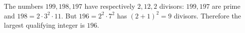 The numbers $199,198,197$ have respectively $2,12,2$ divisors: $199,197$ are prime and $198=2\cdot3^2\cdot11$. But $196=2^2\cdot7^2$ has $(2+1)^2=9$ divisors. Therefore the largest qualifying integer is $\boxed{196}$.
